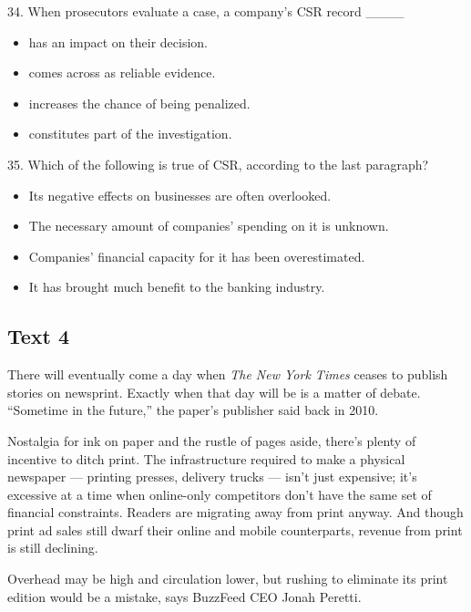 \documentclass[UTF8,11pt]{ctexart}
\begin{document}
34. When prosecutors evaluate a case, a company’s CSR record \_\_\_\_


\begin{itemize}[leftmargin=2em,itemsep=.2em,topsep=.4em]\item[A.] has an impact on their decision.
\item[B.] comes across as reliable evidence.
\item[C.] increases the chance of being penalized.
\item[D.] constitutes part of the investigation.
\end{itemize}

35. Which of the following is true of CSR, according to the last paragraph?


\begin{itemize}[leftmargin=2em,itemsep=.2em,topsep=.4em]\item[A.] Its negative effects on businesses are often overlooked.
\item[B.] The necessary amount of companies’ spending on it is unknown.
\item[C.] Companies’ financial capacity for it has been overestimated.
\item[D.] It has brought much benefit to the banking industry.
\end{itemize}

\subsection*{\textbf{Text 4}}


There will eventually come a day when \textit{The New York Times} ceases to publish stories on newsprint. Exactly when that day will be is a matter of debate. “Sometime in the future,” the paper’s publisher said back in 2010.


Nostalgia for ink on paper and the rustle of pages aside, there’s plenty of incentive to ditch print. The infrastructure required to make a physical newspaper — printing presses, delivery trucks — isn’t just expensive; it’s excessive at a time when online-only competitors don’t have the same set of financial constraints. Readers are migrating away from print anyway. And though print ad sales still dwarf their online and mobile counterparts, revenue from print is still declining.


Overhead may be high and circulation lower, but rushing to eliminate its print edition would be a mistake, says BuzzFeed CEO Jonah Peretti.
\end{document}
